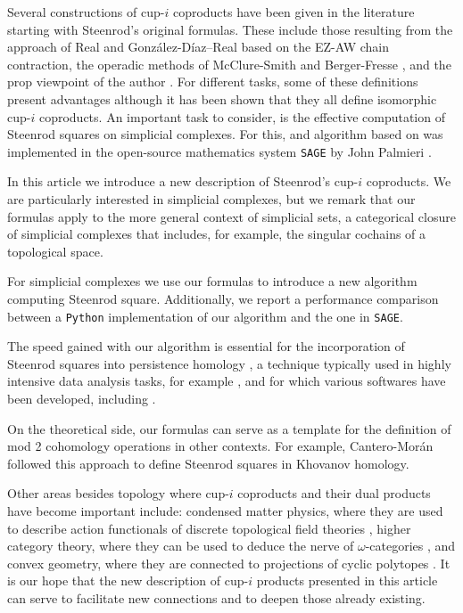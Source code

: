 Several constructions of cup-$i$ coproducts have been given in the literature starting with Steenrod's original formulas.
These include those resulting from the approach of Real \cite{real1996computability} and Gonz\'alez-D\'iaz--Real \cite{gonzalez1999combinatorial, gonzalez2003computation, gonzalez2005hpt} based on the EZ-AW chain contraction, the operadic methods of McClure-Smith \cite{mcclure03cochain} and Berger-Fresse \cite{berger04combinatorial}, and the prop viewpoint of the author \cite{medina2020prop1, medina2018prop2}.
For different tasks, some of these definitions present advantages although it has been shown \cite{medina2018axiomatic} that they all define isomorphic cup-$i$ coproducts.
An important task to consider, is the effective computation of Steenrod squares on simplicial complexes.
For this, and algorithm based on \cite{gonzalez1999combinatorial} was implemented in the open-source mathematics system \verb|SAGE| by John Palmieri \cite{sagemath}.

In this article we introduce a new description of Steenrod's cup-$i$ coproducts.
We are particularly interested in simplicial complexes, but we remark that our formulas apply to the more general context of simplicial sets, a categorical closure of simplicial complexes that includes, for example, the singular cochains of a topological space.

For simplicial complexes we use our formulas to introduce a new algorithm computing Steenrod square.
Additionally, we report a performance comparison between a \verb|Python| implementation of our algorithm and the one in \verb|SAGE|.

The speed gained with our algorithm is essential for the incorporation of Steenrod squares into persistence homology \cite{medina2018persistence}, a technique typically used in highly intensive data analysis tasks, for example \cite{carlsson2008images, carlsson2013viral, lee2018nanoporous}, and for which various softwares have been developed, including \cite{bauer2019ripser, gudhi, medina2020giottotda}.

On the theoretical side, our formulas can serve as a template for the definition of mod 2 cohomology operations in other contexts.
For example, Cantero-Mor\'an \cite{cantero2020khovanov} followed this approach to define Steenrod squares in Khovanov homology.

Other areas besides topology where cup-$i$ coproducts and their dual products have become important include: condensed matter physics, where they are used to describe action functionals of discrete topological field theories \cite{gaiotto2016spin, bhardwaj2017state, kapustin2017fermionic}, higher category theory, where they can be used to deduce the nerve of $\omega$-categories \cite{medina2020globular}, and convex geometry, where they are connected to projections of cyclic polytopes \cite{kapranov1991combinatorial}.
It is our hope that the new description of cup-$i$ products presented in this article can serve to facilitate new connections and to deepen those already existing.

